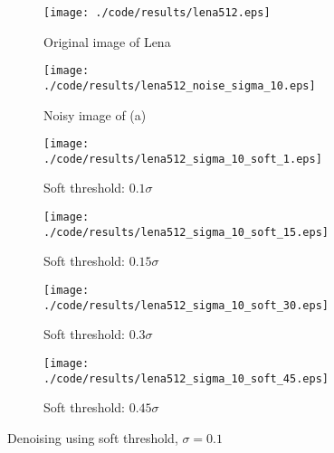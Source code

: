 \documentclass[journal,comsoc]{IEEEtran}
\begin{document}
\begin{figure}[!hbt]
  \centering
  \begin{subfigure}{.25\textwidth}
    \centering
    \texttt{[image: ./code/results/lena512.eps]}
    \caption{Original image of Lena}
    \label{subfig:original-image-of-lena}
  \end{subfigure}%
  \begin{subfigure}{.25\textwidth}
    \centering
    \texttt{[image: ./code/results/lena512\_noise\_sigma\_10.eps]}
    \caption{Noisy image of (a)}
    \label{subfig:sigma-10-noisy-image-of-a}
  \end{subfigure}

  \begin{subfigure}{0.25\textwidth}
    \centering{}
    \texttt{[image: ./code/results/lena512\_sigma\_10\_soft\_1.eps]}
    \caption{Soft threshold: $0.1\sigma$}
  \end{subfigure}%
  \begin{subfigure}{.25\textwidth}
    \centering{}
    \texttt{[image: ./code/results/lena512\_sigma\_10\_soft\_15.eps]}
    \caption{Soft threshold: $0.15\sigma$}
  \end{subfigure}

  \begin{subfigure}{0.25\textwidth}
    \centering{}
    \texttt{[image: ./code/results/lena512\_sigma\_10\_soft\_30.eps]}
    \caption{Soft threshold: $0.3\sigma$}
  \end{subfigure}%
  \begin{subfigure}{.25\textwidth}
    \centering{}
    \texttt{[image: ./code/results/lena512\_sigma\_10\_soft\_45.eps]}
    \caption{Soft threshold: $0.45\sigma$}
  \end{subfigure}
  
  \caption{Denoising using soft threshold, $\sigma=0.1$}
  \label{fig:sigma-10-soft-threshold}
\end{figure}
\end{document}
